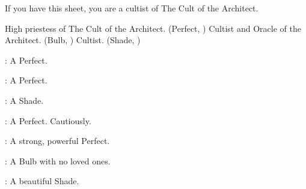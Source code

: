 \documentclass[blue]{Silversiders}
\begin{document}
\name{\bCult{}}

If you have this sheet, you are a cultist of The Cult of the Architect.

\begin{members}
	\member{\cWar{}} High priestess of The Cult of the Architect. (Perfect, \cWar{\Sex})
	\member{\cOracle{}} Cultist and Oracle of the Architect. (Bulb, \cOracle{\Sex})
	\member{\cTrickster{}} Cultist. (Shade, \cTrickster{\Sex})
	
\end{members}

\begin{itemz}
	\item \cFamine{}: A \cFamine{\sex} Perfect.
	\item \cPestilence{}: A \cPestilence{\sex} Perfect.
	\item \cTraitor{}: A \cTraitor{\sex} Shade.
	\item \cDeath{}: A \cDeath{\sex} Perfect. Cautiously.
	
\end{itemz}

\begin{itemz}
	\item \cMuscle{}: A strong, powerful \cMuscle{\sex} Perfect.
	\item \cOutcast{}: A \cOutcast{\sex} Bulb with no loved ones.
	\item \cBeauty{}: A beautiful \cBeauty{\sex} Shade.

\end{itemz}
\end{document}

